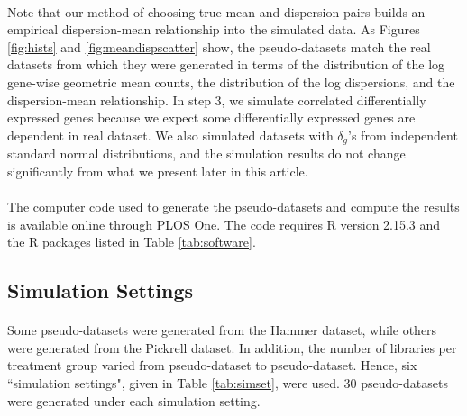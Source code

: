 \documentclass[10pt]{article}
\begin{document}
\paragraph{} \indent Note that our method of choosing true mean and dispersion pairs builds an empirical dispersion-mean relationship into the simulated data. As Figures \ref{fig:hists} and \ref{fig:meandispscatter} show, the pseudo-datasets match the real datasets from which they were generated in terms of the distribution of the log gene-wise geometric mean counts, the distribution of the log dispersions, and the dispersion-mean relationship. In step 3, we simulate correlated differentially expressed %
genes because we expect some differentially expressed %
genes are dependent in real dataset. We also simulated datasets with $\delta_g$'s from independent standard normal distributions, and the simulation results do not change significantly from what we present later in this article.

\paragraph{} \indent The computer code used to generate the pseudo-datasets and compute the results is available online through PLOS One. The code requires R version 2.15.3 and the R packages listed in Table \ref{tab:software}.

\subsection*{Simulation Settings}

\paragraph{} \indent Some pseudo-datasets were generated from the Hammer dataset, while others were generated from the Pickrell dataset. In addition, the number of libraries per treatment group varied from pseudo-dataset to pseudo-dataset. Hence, six ``simulation settings", given in Table \ref{tab:simset}, were used. 30 pseudo-datasets were generated under each simulation setting.
\end{document}
